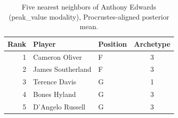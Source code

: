 \begin{table}[htbp]
  \centering\small
  \begin{tabular}{rllc}
    \toprule
    Rank & Player & Position & Archetype \\
    \midrule
    1 & Cameron Oliver & F & 3 \\
    2 & James Southerland & F & 3 \\
    3 & Terence Davis & G & 1 \\
    4 & Bones Hyland & G & 3 \\
    5 & D'Angelo Russell & G & 3 \\
    \bottomrule
  \end{tabular}
  \caption{Five nearest neighbors of Anthony Edwards (peak_value modality), Procrustes-aligned posterior mean.}
  \label{tab:Anthony_Edwards_neighbors_peak_value}
\end{table}


